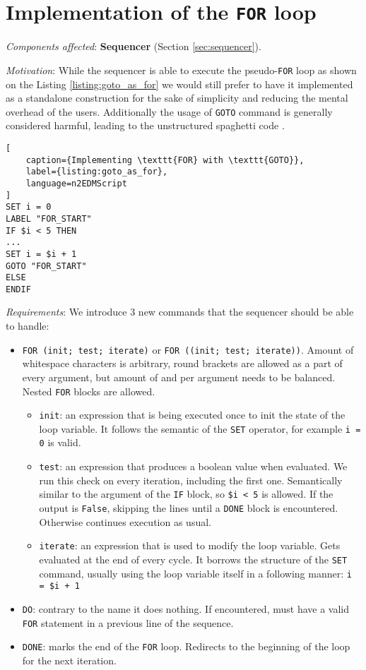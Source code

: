 \section{Implementation of the \texttt{FOR} loop}
\label{sec:for_loop}

\textit{Components affected}: \textbf{Sequencer} (Section \ref{sec:sequencer}).

\textit{Motivation}: While the sequencer is able to execute the pseudo-\texttt{FOR} loop as shown on the Listing \ref{listing:goto_as_for} we would still prefer to have it implemented as a standalone construction for the sake of simplicity and reducing the mental overhead of the users. Additionally the usage of \texttt{GOTO} command is generally considered \cite{Dijkstra1968} harmful, leading to the unstructured spaghetti code \cite{Cram2005}.

\begin{lstlisting}[
	caption={Implementing \texttt{FOR} with \texttt{GOTO}}, 
	label={listing:goto_as_for}, 
	language=n2EDMScript
]
SET i = 0
LABEL "FOR_START"
IF $i < 5 THEN
...
SET i = $i + 1
GOTO "FOR_START"
ELSE
ENDIF
\end{lstlisting}

\textit{Requirements}: We introduce 3 new commands that the sequencer should be able to handle:

\begin{itemize}
	\item \texttt{FOR (init; test; iterate)} or \texttt{FOR ((init; test; iterate))}. Amount of whitespace characters is arbitrary, round brackets are allowed as a part of every argument, but amount of \highlight{(} and \highlight{)} per argument needs to be balanced. Nested \texttt{FOR} blocks are allowed.
	\begin{itemize}
		\item \texttt{init}: an expression that is being executed once to init the state of the loop variable. It follows the semantic of the \texttt{SET} operator, for example \texttt{i = 0} is valid.
		\item \texttt{test}: an expression that produces a boolean value when evaluated. We run this check on every iteration, including the first one. Semantically similar to the argument of the \texttt{IF} block, so \texttt{\$i < 5} is allowed. If the output is \texttt{False}, skipping the lines until a \texttt{DONE} block is encountered. Otherwise continues execution as usual.
		\item \texttt{iterate}: an expression that is used to modify the loop variable. Gets evaluated at the end of every cycle. It borrows the structure of the \texttt{SET} command, usually using the loop variable itself in a following manner: \texttt{i = \$i + 1}
	\end{itemize}
	\item \texttt{DO}: contrary to the name it does nothing. If encountered, must have a valid \texttt{FOR} statement in a previous line of the sequence.
	\item \texttt{DONE}: marks the end of the \texttt{FOR} loop. Redirects to the beginning of the loop for the next iteration.
\end{itemize}

